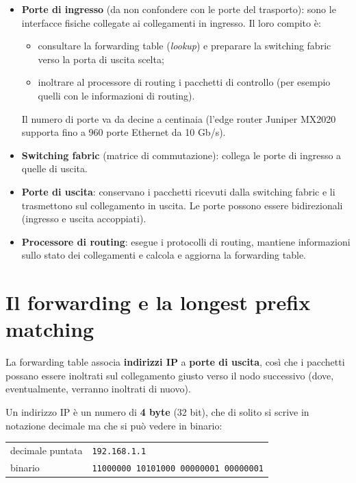 \begin{itemize}
    \item \textbf{Porte di ingresso} (da non confondere con le porte del trasporto): sono le interfacce fisiche
          collegate ai collegamenti in ingresso. Il loro compito è:
    \begin{itemize}
      \item consultare la forwarding table (\emph{lookup}) e preparare la switching fabric verso la porta di uscita scelta;
      \item inoltrare al processore di routing i pacchetti di controllo (per esempio quelli con le informazioni di routing).
    \end{itemize}
    Il numero di porte va da decine a centinaia (l'edge router Juniper MX2020 supporta fino a 960 porte Ethernet da 10 Gb/s).
    \item \textbf{Switching fabric} (matrice di commutazione): collega le porte di ingresso a quelle di uscita.
    \item \textbf{Porte di uscita}: conservano i pacchetti ricevuti dalla switching fabric e li trasmettono sul
          collegamento in uscita. Le porte possono essere bidirezionali (ingresso e uscita accoppiati).
    \item \textbf{Processore di routing}: esegue i protocolli di routing, mantiene informazioni sullo stato dei
          collegamenti e calcola e aggiorna la forwarding table.
\end{itemize}

\section{Il forwarding e la longest prefix matching}

La forwarding table associa \textbf{indirizzi IP} a \textbf{porte di uscita}, così che i pacchetti possano essere
inoltrati sul collegamento giusto verso il nodo successivo (dove, eventualmente, verranno inoltrati di nuovo).

Un indirizzo IP è un numero di \textbf{4 byte} (32 bit), che di solito si scrive in notazione decimale ma che si può
vedere in binario:

\begin{center}
\begin{tabular}{ll}
decimale puntata & \texttt{192.168.1.1} \\
binario & \texttt{11000000 10101000 00000001 00000001} \\
\end{tabular}
\end{center}

